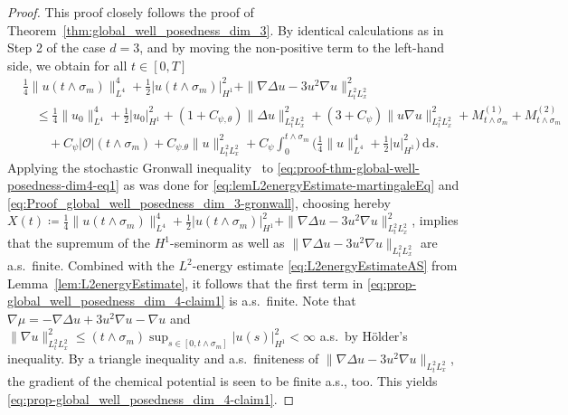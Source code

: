 \documentclass[reqno]{amsart}
\newcommand{\sO}{\mathscr{O}}
\newcommand{\ce}{\coloneqq}
\newcommand{\1}{\mathbf{1}}
\newcommand{\grad}{\nabla}
\newcommand{\ds}{\,\mathrm{d}s}
\newcommand{\inttm}{\int_0^{t\wedge\sigma_m}}
\begin{document}
\begin{proof}
This proof closely follows the proof of Theorem~\ref{thm:global_well_posedness_dim_3}. 
By identical calculations as in Step 2 of the case $d=3$, and by moving the non-positive term to the left-hand side,  we obtain for all $t\in[0,T]$
    \begin{align}\label{eq:proof-thm-global-well-posedness-dim4-eq1}
        &\frac{1}{4}\|u(t\land \sigma_m)\|_{L^4}^4 + \frac{1}{2}|u(t \land \sigma_m)|^2_{H^1} + \|\grad \Delta u-3u^2 \grad u\|_{L_t^2L_x^2}^2 \nonumber \\
        & \quad \le\frac{1}{4}\|u_0\|_{L^4}^4 + \frac{1}{2}|u_0|^2_{H^1}+ (1+C_{\psi,\theta}) \|\Delta u\|_{L_t^2L_x^2}^2 
         + (3+C_\psi)\|u\grad u\|_{L_t^2L_x^2}^2 + M^{(1)}_{t\land \sigma_m} + M^{(2)}_{t\land\sigma_m}\nonumber \\
         &\qquad +C_\psi|\sO|(t\land \sigma_m)+ C_{\psi.\theta} \|u\|_{L_t^2L_x^2}^2+ C_\psi \inttm \Big(\frac{1}{4}\|u\|_{L^4}^4+\frac{1}{2}|u|_{H^1}^2\Big)  \ds.
    \end{align}
Applying the stochastic Gronwall inequality~\cite[Corollary 5.4]{Geiss24} to \eqref{eq:proof-thm-global-well-posedness-dim4-eq1} as was done for \eqref{eq:lemL2energyEstimate-martingaleEq} and \eqref{eq:Proof_global_well_posedness_dim_3-gronwall}, choosing hereby $X(t) \ce \frac{1}{4}\|u(t\land \sigma_m)\|_{L^4}^4 + \frac{1}{2}|u(t \land \sigma_m)|^2_{H^1} + \|\grad \Delta u-3u^2 \grad u\|_{L_t^2L_x^2}^2$, implies that the supremum of the $H^1$-seminorm as well as $\|\grad \Delta u - 3u^2\grad u\|_{L_t^2L_x^2}$ are a.s.\ finite. Combined with the $L^2$-energy estimate \eqref{eq:L2energyEstimateAS} from Lemma~\ref{lem:L2energyEstimate}, it follows that the first term in \eqref{eq:prop-global_well_posedness_dim_4-claim1} is a.s.\ finite. Note that $\grad \mu = -\grad\Delta u +3u^2\grad u-\grad u$ and $\|\grad u\|^2_{L_t^2L_x^2}\le (t\land \sigma_m)\sup_{s\in [0,t\land \sigma_m]} |u(s)|_{H^1}^2 <\infty$ a.s.\ by Hölder's inequality. By a triangle inequality and a.s.\ finiteness of $\|\grad \Delta u - 3u^2\grad u\|_{L_t^2L_x^2}$, the gradient of the chemical potential is seen to be finite a.s., too. This yields \eqref{eq:prop-global_well_posedness_dim_4-claim1}.


\end{proof}
\end{document}
